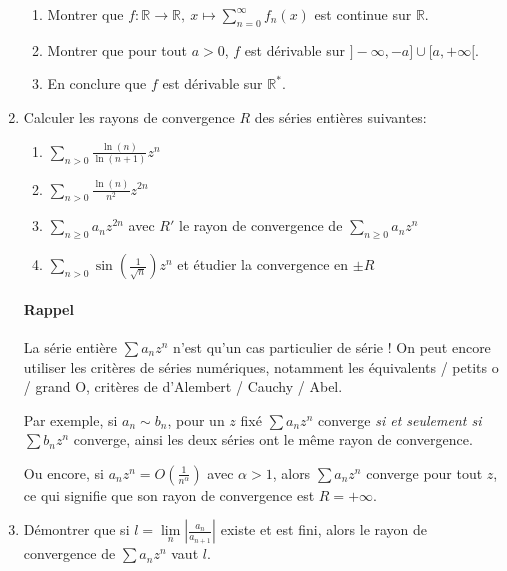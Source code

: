 \documentclass[]{article}
\begin{document}
\begin{enumerate}
\begin{enumerate}
	\item Montrer que $\displaystyle f : \mathbb{R} \longrightarrow \mathbb{R}, ~ x \longmapsto \sum_{n=0}^{\infty}f_n(x)$ est continue sur $\mathbb{R}$.
	
	\item Montrer que pour tout $a > 0$, $f$ est dérivable sur $]-\infty, -a] \cup [a, +\infty[$.
	
	\item En conclure que $f$ est dérivable sur $\mathbb{R}^*$.
\end{enumerate}

\item Calculer les rayons de convergence $R$ des séries entières suivantes:
\begin{enumerate}
	\item $\displaystyle \sum_{n > 0}\frac{\ln(n)}{\ln(n+1)}z^n$
	
	\item $\displaystyle \sum_{n > 0}\frac{\ln(n)}{n^2}z^{2n}$
	
	\item $\displaystyle \sum_{n \geqslant 0}a_n z^{2n}$ avec $R'$ le rayon de convergence de $\displaystyle \sum_{n \geqslant 0}a_n z^n$
	
	\item $\displaystyle \sum_{n > 0} \sin \left(\frac{1}{\sqrt{n}}\right) z^n$ et étudier la convergence en $\pm R$
	\end{enumerate}

\paragraph{Rappel} La série entière $\sum a_n z^n$ n'est qu'un cas particulier de série ! On peut encore utiliser les critères de séries numériques, notamment les équivalents / petits o / grand O, critères de d'Alembert / Cauchy / Abel.

Par exemple, si $a_n \sim b_n$, pour un $z$ fixé $\sum a_n z^n$ converge \textit{si et seulement si} $\sum b_n z^n$ converge, ainsi les deux séries ont le même rayon de convergence.

Ou encore, si $a_n z^n = O\left( \frac{1}{n^\alpha}\right)$ avec $\alpha > 1$, alors $\sum a_n z^n$ converge pour tout $z$, ce qui signifie que son rayon de convergence est $R= +\infty$.

\item Démontrer que si $l = \lim\limits_{n} \left|\frac{a_n}{a_{n+1}}\right|$ existe et est fini, alors le rayon de convergence de $\sum a_nz^n$ vaut $l$.


\end{enumerate}
\end{document}
